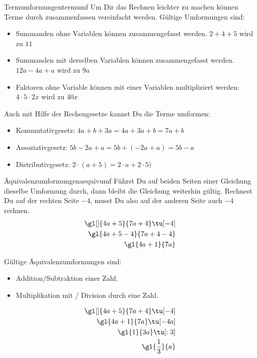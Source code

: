 \documentclass[12pt,a5paper,landscape]{scrartcl}
\begin{document}
\begin{hilfekarte}{Termumformungen}{termumf}
	Um Dir das Rechnen leichter zu machen können Terme durch zusammenfassen vereinfacht werden. Gültige Umformungen sind:
	
	\begin{itemize}
		\item Summanden ohne Variablen können zusammengefasst werden. $2 + 4 + 5$ wird zu $11$
		\item Summanden mit derselben Variablen können zusammengefasst werden. $12a - 4a + a$ wird zu $9a$
		\item Faktoren ohne Variable können mit einer Variablen multipliziert werden: $4\cdot 5\cdot 2x$ wird zu $40x$
	\end{itemize}
	
	Auch mit Hilfe der Rechengesetze kannst Du die Terme umformen:
	\begin{itemize}
		\item Kommutativgesetz: $4a + b + 3a = 4a + 3a + b = 7a + b$
		\item Assoziativgesetz: $5b - 2a + a = 5b + (-2a + a) = 5b - a$
		\item Distributivgesetz: $2\cdot (a + 5) = 2\cdot a + 2\cdot 5)$
	\end{itemize}
\end{hilfekarte}

\leereKarte

\begin{hilfekarte}{Äquivalenzumformungen}{aequivumf}
	Führst Du auf beiden Seiten einer Gleichung dieselbe Umformung durch, dann bleibt die Gleichung weiterhin gültig.
	Rechnest Du auf der rechten Seite $-4$, musst Du also auf der anderen Seite auch $-4$ rechnen.
	\begin{alignat*}{3}
	\gl[]{4a + 5}{7a + 4} \tu[-4]\\
	\gl{4a + 5 - 4}{7a + 4 - 4} \\
	\gl{4a + 1}{7a}
	\end{alignat*}
	
	Gültige Äquivalenzumformungen sind:
	\begin{itemize}
		\item Addition/Subtraktion einer Zahl.
		\item Multiplikation mit / Division durch eine Zahl.
	\end{itemize}
\end{hilfekarte}

\begin{loesungskarte}[Äquivalenzumformungen]
	\begin{alignat*}{3}
		\gl[]{4a + 5}{7a + 4} \tu[-4]\\
		\gl{4a + 1}{7a} \tu[-4a] \\
		\gl{1}{3a} \tu[:3] \\
		\gl{\dfrac{1}{3}}{a}
	\end{alignat*}
\end{loesungskarte}
\end{document}
